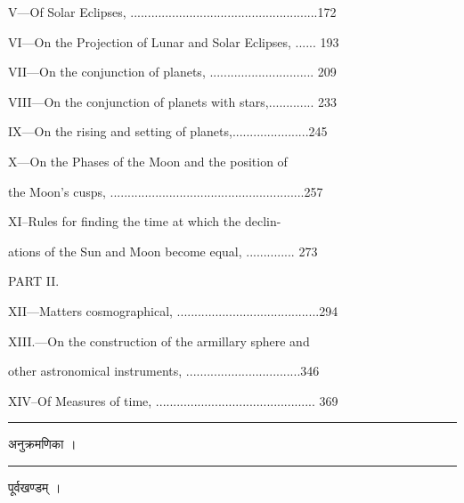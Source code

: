 \documentclass[11pt, openany]{book}
\begin{document}
\hspace{1em} V---Of Solar Eclipses, ......................................................\hfill 172 

\hspace{1em} VI---On the Projection of Lunar and Solar Eclipses, ...... \hfill 193

\hspace{1em} VII---On the conjunction of planets,
.............................. \hfill 209

\hspace{1em} VIII---On the conjunction of planets with stars,............. \hfill 233

\hspace{1em} IX---On the rising and setting of planets,......................\hfill 245

\hspace{1em} X---On the Phases of the Moon and the position of

\hspace{2em} the Moon's cusps, ........................................................\hfill 257 

\hspace{1em} XI--Rules for finding the time at which the declin-

\hspace{2em} ations of the Sun and Moon become equal, .............. \hfill 273

\begin{center}
   PART II. 
\end{center}

\hspace{1em} XII---Matters cosmographical, .........................................\hfill 294

\hspace{1em} XIII.---On the construction of the armillary sphere and

\hspace{2em} other astronomical instruments, .................................\hfill 346

\hspace{1em} XIV--Of Measures of time, .............................................. \hfill 369
\vspace{3mm}

\begin{center}
     \rule{8em}{.5pt}
\end{center}


\newpage

\begin{center}

 अनुक्रमणिका ।
\vspace{3mm}

 \rule{7em}{.5pt}
\vspace{3mm}
 
 पूर्वखण्डम् ।
\end{center}
\end{document}
